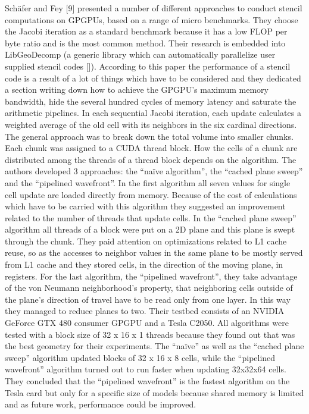 Schäfer and Fey [9] presented a number of different approaches to conduct stencil computations on GPGPUs, based on a range of micro benchmarks. They choose the Jacobi iteration as a standard benchmark because it has a low FLOP per byte ratio and is the most common method. Their research is embedded into LibGeoDecomp (a generic library which can automatically parallelize user supplied stencil codes []). According to this paper the performance of a stencil code is a result of a lot of things which have to be considered and they dedicated a section writing down how to achieve the GPGPU's maximum memory bandwidth, hide the several hundred cycles of memory latency and saturate the arithmetic pipelines. In each sequential Jacobi iteration, each update calculates a weighted average of the old cell with its neighbors in the six cardinal directions. The general approach was to break down the total volume into smaller chunks. Each chunk was assigned to a CUDA thread block. How the cells of a chunk are distributed among the threads of a thread block depends on the algorithm. The authors developed 3 approaches: the “naïve algorithm”, the “cached plane sweep” and the “pipelined wavefront”. In the first algorithm all seven values for single cell update are loaded directly from memory. Because of the cost of calculations which have to be carried with this algorithm they suggested an improvement related to the number of threads that update cells. In the “cached plane sweep” algorithm all threads of a block were put on a 2D plane and this plane is swept through the chunk. They paid attention on optimizations related to L1 cache reuse, so as the accesses to neighbor values in the same plane to be mostly served from L1 cache and they stored cells, in the direction of the moving plane, in registers. For the last algorithm, the “pipelined wavefront”, they take advantage of the von Neumann neighborhood’s property, that neighboring cells outside of the plane’s direction of travel have to be read only from one layer. In this way they managed to reduce planes to two. Their testbed consists of an NVIDIA GeForce GTX 480 consumer GPGPU and a Tesla C2050. All algorithms were tested with a block size of 32 x 16 x 1 threads because they found out that was the best geometry for their experiments. The “naïve” as well as the “cached plane sweep” algorithm updated blocks of 32 x 16 x 8 cells, while the “pipelined wavefront” algorithm turned out to run faster when updating 32x32x64 cells. They concluded that the “pipelined wavefront” is the fastest algorithm on the Tesla card but only for a specific size of models because shared memory is limited and as future work, performance could be improved.  


